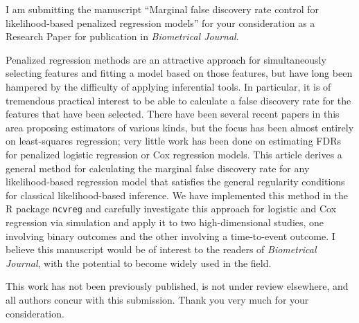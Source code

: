 \documentclass{uiletter}
\begin{document}

I am submitting the manuscript ``Marginal false discovery rate control for likelihood-based penalized regression models'' for your consideration as a Research Paper for publication in {\em Biometrical Journal}.  

Penalized regression methods are an attractive approach for simultaneously selecting features and fitting a model based on those features, but have long been hampered by the difficulty of applying inferential tools.  In particular, it is of tremendous practical interest to be able to calculate a false discovery rate for the features that have been selected.  There have been several recent papers in this area proposing estimators of various kinds, but the focus has been almost entirely on least-squares regression; very little work has been done on estimating FDRs for penalized logistic regression or Cox regression models.  This article derives a general method for calculating the marginal false discovery rate for any likelihood-based regression model that satisfies the general regularity conditions for classical likelihood-based inference.  We have implemented this method in the R package {\tt ncvreg} and carefully investigate this approach for logistic and Cox regression via simulation and apply it to two high-dimensional studies, one involving binary outcomes and the other involving a time-to-event outcome.  I believe this manuscript would be of interest to the readers of {\em Biometrical Journal}, with the potential to become widely used in the field.

This work has not been previously published, is not under review elsewhere, and all authors concur with this submission.  Thank you very much for your consideration.

\EndLetter
\end{document}
